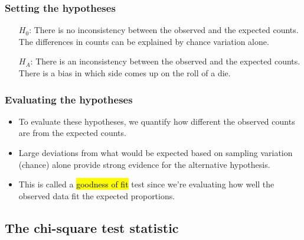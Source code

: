 \documentclass[slidestop,compress,mathserif]{beamer}
\begin{document}

\begin{frame}
\frametitle{Setting the hypotheses}


\pause

\begin{itemize}
\item[$H_0$:] There is no inconsistency between the observed and the expected counts.  The differences in counts can be explained by chance variation alone.

\pause

\item[$H_A$:] There is an inconsistency between the observed and the expected counts.  There is a bias in which side comes up on the roll of a die.
\end{itemize}

\end{frame}


\begin{frame}
\frametitle{Evaluating the hypotheses}

\begin{itemize}

\item To evaluate these hypotheses, we quantify how different the observed counts are from the expected counts. 

\pause

\item Large deviations from what would be expected based on sampling variation (chance) alone provide strong evidence for the alternative hypothesis.

\pause

\item This is called a \hl{goodness of fit} test since we're evaluating how well the observed data fit the expected proportions.

\end{itemize}

\end{frame}


\subsection{The chi-square test statistic}
\end{document}
